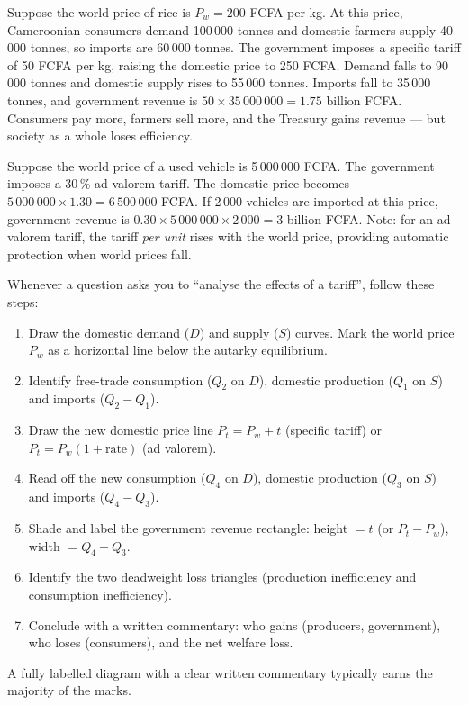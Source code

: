 \documentclass[11pt]{article}
\begin{document}
\begin{exemplebox}
Suppose the world price of rice is $P_w = 200$ FCFA per kg. At this price, Cameroonian consumers demand 100\,000 tonnes and domestic farmers supply 40\,000 tonnes, so imports are 60\,000 tonnes. The government imposes a specific tariff of 50 FCFA per kg, raising the domestic price to 250 FCFA. Demand falls to 90\,000 tonnes and domestic supply rises to 55\,000 tonnes. Imports fall to 35\,000 tonnes, and government revenue is $50 \times 35\,000\,000 = 1.75$ billion FCFA. Consumers pay more, farmers sell more, and the Treasury gains revenue --- but society as a whole loses efficiency.
\end{exemplebox}

\begin{exemplebox}
Suppose the world price of a used vehicle is 5\,000\,000 FCFA. The government imposes a 30\,\% ad valorem tariff. The domestic price becomes $5\,000\,000 \times 1.30 = 6\,500\,000$ FCFA. If 2\,000 vehicles are imported at this price, government revenue is $0.30 \times 5\,000\,000 \times 2\,000 = 3$ billion FCFA. Note: for an ad valorem tariff, the tariff \emph{per unit} rises with the world price, providing automatic protection when world prices fall.
\end{exemplebox}

\begin{methode}
Whenever a question asks you to ``analyse the effects of a tariff'', follow these steps:
\begin{enumerate}
\item Draw the domestic demand ($D$) and supply ($S$) curves. Mark the world price $P_w$ as a horizontal line below the autarky equilibrium.
\item Identify free-trade consumption ($Q_2$ on $D$), domestic production ($Q_1$ on $S$) and imports ($Q_2 - Q_1$).
\item Draw the new domestic price line $P_t = P_w + t$ (specific tariff) or $P_t = P_w(1 + \text{rate})$ (ad valorem).
\item Read off the new consumption ($Q_4$ on $D$), domestic production ($Q_3$ on $S$) and imports ($Q_4 - Q_3$).
\item Shade and label the government revenue rectangle: height $= t$ (or $P_t - P_w$), width $= Q_4 - Q_3$.
\item Identify the two deadweight loss triangles (production inefficiency and consumption inefficiency).
\item Conclude with a written commentary: who gains (producers, government), who loses (consumers), and the net welfare loss.
\end{enumerate}
A fully labelled diagram with a clear written commentary typically earns the majority of the marks.
\end{methode}
\end{document}
